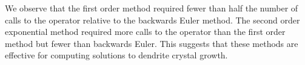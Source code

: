 We observe that the first order method required fewer than half the number of calls to the operator relative to the backwards Euler method.
The second order exponential method required more calls to the operator than the first order method but fewer than backwards Euler.
This suggests that these methods are effective for computing solutions to dendrite crystal growth.
